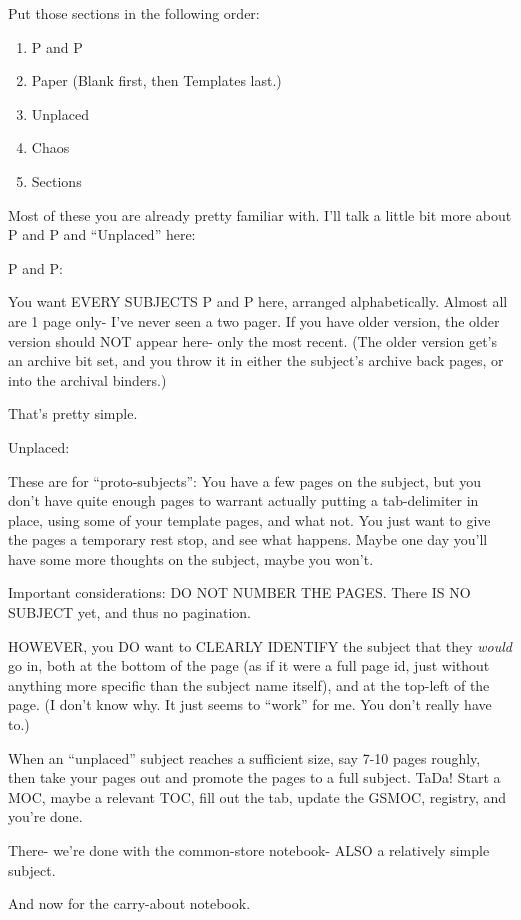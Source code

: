 \documentclass[oneside]{book}
\begin{document}
Put those sections in the following order:

\begin{enumerate}
\item P and P
\item Paper (Blank first, then Templates last.)
\item Unplaced
\item Chaos
\item Sections
\end{enumerate}

Most of these you are already pretty familiar with. I'll talk a little
bit more about P and P and ``Unplaced'' here:

P and P:

You want EVERY SUBJECTS P and P here, arranged alphabetically. Almost all
are 1 page only- I've never seen a two pager. If you have older
version, the older version should NOT appear here- only the most
recent. (The older version get's an archive bit set, and you throw it
in either the subject's archive back pages, or into the archival
binders.)

That's pretty simple.

Unplaced:

These are for ``proto-subjects'': You have a few pages on the subject,
but you don't have quite enough pages to warrant actually putting a
tab-delimiter in place, using some of your template pages, and what
not. You just want to give the pages a temporary rest stop, and see
what happens. Maybe one day you'll have some more thoughts on the
subject, maybe you won't.

Important considerations: DO NOT NUMBER THE PAGES. There IS NO SUBJECT
yet, and thus no pagination.

HOWEVER, you DO want to CLEARLY IDENTIFY the subject that they \emph{would}
go in, both at the bottom of the page (as if it were a full page id,
just without anything more specific than the subject name itself), and
at the top-left of the page. (I don't know why. It just seems to
``work'' for me. You don't really have to.)

When an ``unplaced'' subject reaches a sufficient size, say 7-10 pages
roughly, then take your pages out and promote the pages to a full
subject. TaDa! Start a MOC, maybe a relevant TOC, fill out the tab,
update the GSMOC, registry, and you're done.

There- we're done with the common-store notebook- ALSO a relatively
simple subject.

And now for the carry-about notebook.
\end{document}
